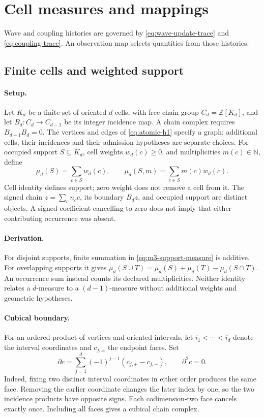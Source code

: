 \section{Cell measures and mappings}
\label{sec:m3-cells}
Wave and coupling histories are governed by \eqref{eq:wave-update-trace}
and \eqref{eq:coupling-trace}. An observation map selects quantities from
those histories.

\subsection{Finite cells and weighted support}
\label{def:m3-cell-complex}
\paragraph{Setup.}
Let \(K_d\) be a finite set of oriented \(d\)-cells, with free chain group
\(C_d=\mathbb Z[K_d]\), and let \(B_d:C_d\to C_{d-1}\) be its
integer incidence map. A chain complex requires \(B_{d-1}B_d=0\).
The vertices and edges of \eqref{eq:atomic-h1} specify a graph; additional
cells, their incidences and their admission hypotheses are separate choices.
For occupied support \(S\subseteq K_d\), cell weights \(w_d(c)\ge0\), and
multiplicities \(m(c)\in\mathbb N\), define
\begin{equation}
 \mu_d(S)=\sum_{c\in S}w_d(c),\qquad
 \mu_d(S,m)=\sum_{c\in S}m(c)w_d(c).
 \label{eq:m3-support-measure}
\end{equation}
Cell identity defines support; zero weight does not remove a cell from it.
The signed chain \(z=\sum_c n_c c\), its boundary \(B_dz\), and occupied
support are distinct objects. A signed coefficient cancelling to zero
does not imply that either contributing occurrence was absent.

\paragraph{Derivation.}
For disjoint supports, finite summation in \eqref{eq:m3-support-measure}
is additive. For overlapping supports it gives
\(\mu_d(S\cup T)=\mu_d(S)+\mu_d(T)-\mu_d(S\cap T)\).
An occurrence sum instead counts its declared multiplicities. Neither
identity relates a \(d\)-measure to a \((d-1)\)-measure without additional
weights and geometric hypotheses.

\paragraph{Cubical boundary.}
\label{prop:m3-cell-boundary}
For an ordered product of vertices and oriented intervals, let
\(i_1<\cdots<i_d\) denote the interval coordinates and \(c_{j,\pm}\)
the endpoint faces. Set
\begin{equation}
 \partial c=\sum_{j=1}^{d}(-1)^{j-1}(c_{j,+}-c_{j,-}),
 \qquad \partial^2c=0.
 \label{eq:m3-cubical-boundary}
\end{equation}
Indeed, fixing two distinct interval coordinates in either order produces
the same face. Removing the earlier coordinate changes the later index by
one, so the two incidence products have opposite signs. Each codimension-two
face cancels exactly once. Including all faces gives a cubical chain complex.


